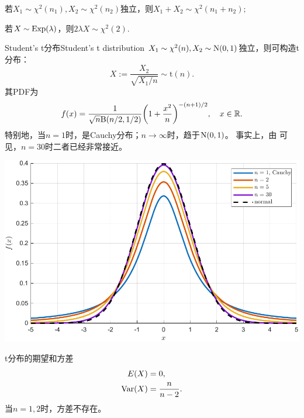\begin{corollary}
	若$X_1\sim\chi^2(n_1),X_2\sim\chi^2(n_2)$独立，则$X_1+X_2\sim\chi^2(n_1+n_2);$
\end{corollary}

\begin{corollary}
	若$X\sim\operatorname{Exp}(\lambda)$，则$2\lambda X\sim\chi^2(2).$
\end{corollary}

\begin{definition}{Student's t分布}{Student's t distribution}
	$X_1\sim\chi^2(n),X_2\sim\operatorname{N}(0,1)$独立，则可构造t分布：
	\[
		X:=\frac{X_2}{\sqrt{X_1/n}}\sim\mathrm t(n).
	\]
	其PDF为
	\begin{equation}
		f(x)=\frac1{\sqrt n\mathrm B(n/2,1/2)}\biggl(1+\frac{x^2}n\biggr)^{-(n+1)/2},\quad x\in\mathbb R.
	\end{equation}
	特别地，当$n=1$时，是Cauchy分布；$n\to\infty$时，趋于$\operatorname{N}(0,1)$。
	事实上，由 可见，$n=30$时二者已经非常接近。
	\begin{center}
		\includegraphics[width=0.8\linewidth]{figures/pdf_t.pdf}
		\label{fig:pdf_t}
	\end{center}
\end{definition}

\begin{corollary}
	t分布的期望和方差
	\begin{subequations}
		\begin{align}
			E(X)&=0,\\
			\operatorname{Var}(X)&=\frac{n}{n-2}.
		\end{align}
	\end{subequations}
	当$n=1,2$时，方差不存在。
\end{corollary}

